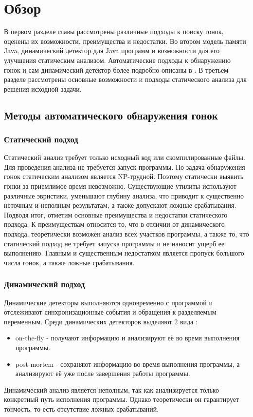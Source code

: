 \chapter{Обзор}
\label{chapSVD}

В первом разделе главы рассмотрены различные подходы к поиску гонок, оценены их возможности, преимущества и недостатки. 
Во втором модель памяти Java, динамический детектор для Java программ и возможности для его улучшения статическим анализом.
Автоматические подходы к обнаружению гонок и сам динамический детектор более подробно описаны в \cite{DRD}.
В третьем разделе рассмотрены основные возможности и подходы статического анализа для решения исходной задачи.


\FloatBarrier
\section{Методы автоматического обнаружения гонок}
\subsection{Статический подход}
Статический анализ требует только исходный код или скомпилированные файлы. Для проведения анализа не требуется запуск программы. Но задача обнаружения гонок статическим анализом является NP-трудной. Поэтому статически выявить гонки за приемлимое время невозможно. Существующие утилиты используют различные эвристики, уменьшают глубину анализа, что приводит к существенно неточным и неполным результатам, а также допускают ложные срабатывания.
Подводя итог, отметим основные преимущества и недостатки статического подхода. К преимуществам относится то, что в отличии от динамического подхода, теоретически возможен анализ всех участков программы, а также то, что статический подход не требует запуска программы и не наносит ущерб ее выполнению. Главным и существенным недостатком является
пропуск большого числа гонок, а также ложные срабатывания.


\subsection{Динамический подход}
Динамические детекторы выполняются одновременно с программой и отслеживают синхронизационные события и обращения к разделяемым переменным. Среди динамических детекторов выделяют 2 вида : 
\begin{itemize}
\item on-the-fly - получают информацию и анализируют её во время выполнения программы.
\item post-mortem - сохраняют информацию во время выполнения программы, а анализируют её уже
после завершения работы программы.
\end{itemize}
Динамический анализ является неполным, так как анализируется только конкретный путь исполнения программы. Однако теоретически он гарантирует тончость, то есть отсутствие ложных срабатываний. 


